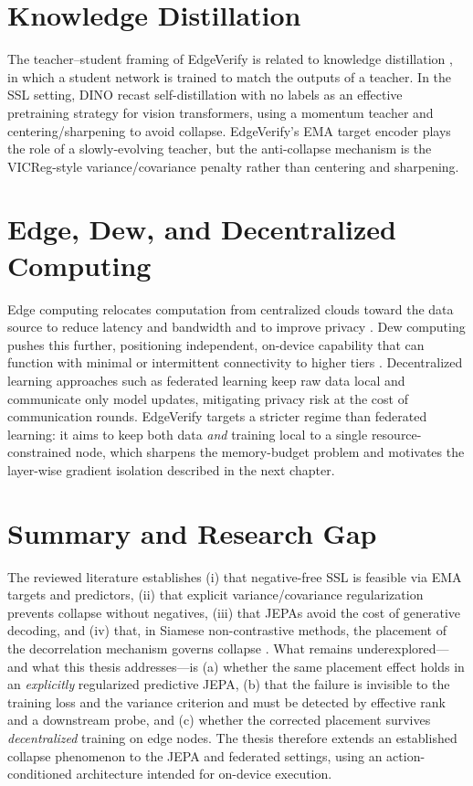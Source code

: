 \section{Knowledge Distillation}
The teacher--student framing of EdgeVerify is related to knowledge
distillation \cite{hinton2015distilling}, in which a student network is
trained to match the outputs of a teacher. In the SSL setting, DINO
\cite{caron2021emerging} recast self-distillation with no labels as an
effective pretraining strategy for vision transformers, using a
momentum teacher and centering/sharpening to avoid collapse. EdgeVerify's
EMA target encoder plays the role of a slowly-evolving teacher, but the
anti-collapse mechanism is the VICReg-style variance/covariance penalty
rather than centering and sharpening.

\section{Edge, Dew, and Decentralized Computing}
Edge computing relocates computation from centralized clouds toward the
data source to reduce latency and bandwidth and to improve privacy
\cite{shi2016edge}. Dew computing pushes this further, positioning
independent, on-device capability that can function with minimal or
intermittent connectivity to higher tiers \cite{wang2016dew}. Decentralized
learning approaches such as federated learning \cite{mcmahan2017communication}
keep raw data local and communicate only model updates, mitigating privacy
risk at the cost of communication rounds. EdgeVerify targets a stricter
regime than federated learning: it aims to keep both data \emph{and}
training local to a single resource-constrained node, which sharpens the
memory-budget problem and motivates the layer-wise gradient isolation
described in the next chapter.

\section{Summary and Research Gap}
The reviewed literature establishes (i) that negative-free SSL is feasible
via EMA targets and predictors, (ii) that explicit variance/covariance
regularization prevents collapse without negatives, (iii) that JEPAs
avoid the cost of generative decoding, and (iv) that, in Siamese
non-contrastive methods, the placement of the decorrelation mechanism
governs collapse \cite{li2022understanding, liu2022bridging}. What remains
underexplored---and what this thesis addresses---is (a) whether the same
placement effect holds in an \emph{explicitly} regularized predictive JEPA,
(b) that the failure is invisible to the training loss and the variance
criterion and must be detected by effective rank and a downstream probe, and
(c) whether the corrected placement survives \emph{decentralized} training on
edge nodes. The thesis therefore extends an established collapse phenomenon
to the JEPA and federated settings, using an action-conditioned architecture
intended for on-device execution.
